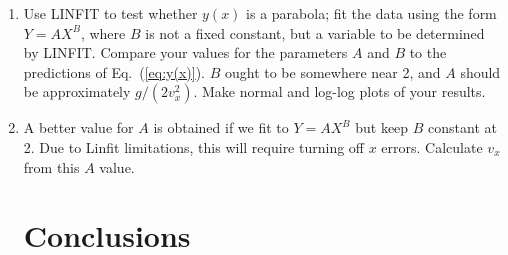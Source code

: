 \begin{enumerate}
%
%
%
%
%
%
%

\item Use LINFIT to test whether $y(x)$ is a parabola; fit the data using
the form $Y = AX^{B}$, where $B$ is not a fixed constant, but a variable to
be determined by LINFIT.  Compare your values for the parameters $A$ and $B$
to the predictions of Eq.~(\ref{eq:y(x)}).  $B$ ought to be somewhere near
2, and $A$ should be approximately $g/(2v_{x}^{2})$.
Make normal and log-log plots of your results.

\item A better value for $A$ is obtained if we fit 
to $Y = AX^{B}$ but keep $B$ constant
at 2.  Due to Linfit limitations, this will require turning off
$x$ errors.  Calculate $v_x$ from this $A$ value.

\section*{Conclusions}


\end{enumerate}

